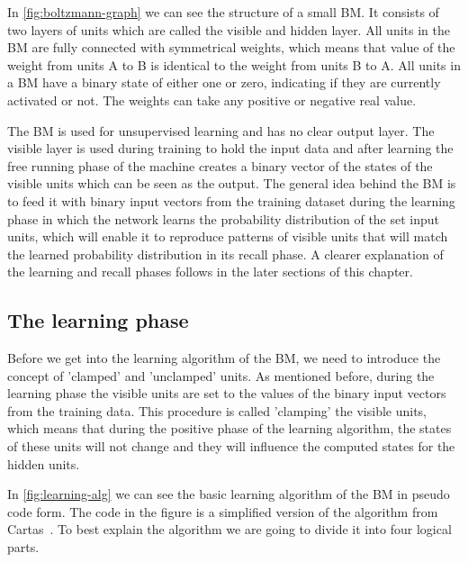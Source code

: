\documentclass[12pt,twoside]{article}
\theoremstyle{plain}
\theoremstyle{definition}
\theoremstyle{remark}
\begin{document}
\noindent
In \cref{fig:boltzmann-graph} we can see the structure of a small BM. It consists of two layers of units which are called the visible and hidden layer.
All units in the BM are fully connected with symmetrical weights, which means that value of the weight from units A to B is identical to
the weight from units B to A. All units in a BM have a binary state of either one or zero, indicating if they are currently activated or not.
The weights can take any positive or negative real value.

The BM is used for unsupervised learning and has no clear output layer. The visible layer is used during training to hold the input data and
after learning the free running phase of the machine creates a binary vector of the states of the visible units which can be seen as the output.
The general idea behind the BM is to feed it with binary input vectors from the training dataset during the learning phase
in which the network learns the probability distribution of the set input units, which will enable it to reproduce patterns of visible units
that will match the learned probability distribution in its recall phase. A clearer explanation of the learning and recall phases follows in the 
later sections of this chapter.


\subsection{The learning phase}
Before we get into the learning algorithm of the BM, we need to introduce the concept of 'clamped' and 'unclamped' units.
As mentioned before, during the learning phase the visible units are set to the values of the binary input vectors from the training data.
This procedure is called 'clamping' the visible units, which means that during the positive phase of the learning
algorithm, the states of these units will not change and they will influence the computed states for the hidden units.

In \cref{fig:learning-alg} we can see the basic learning algorithm of the BM in pseudo code form.
The code in the figure is a simplified version of the algorithm from Cartas~\cite{BMImpl}.
To best explain the algorithm we are going to divide it into four logical parts.
\end{document}
